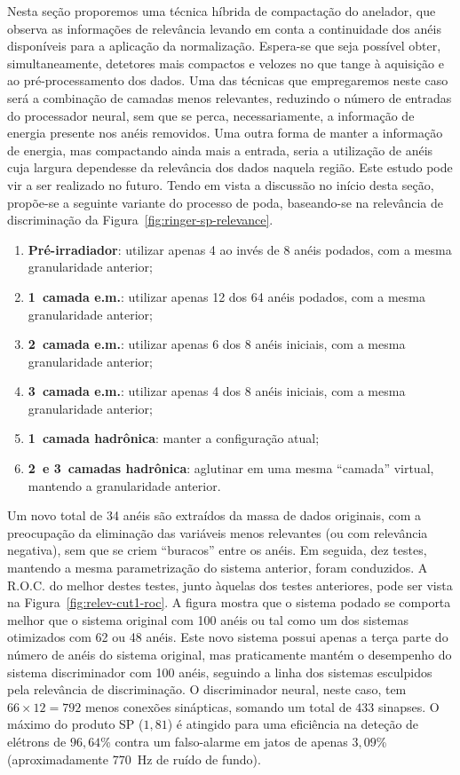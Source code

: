 Nesta seção proporemos uma técnica híbrida de compactação do anelador, que
observa as informações de relevância levando em conta a continuidade dos anéis
disponíveis para a aplicação da normalização. Espera-se que seja possível
obter, simultaneamente, detetores mais compactos e velozes no que tange à
aquisição e ao pré-processamento dos dados. Uma das técnicas que empregaremos
neste caso será a combinação de camadas menos relevantes, reduzindo o número
de entradas do processador neural, sem que se perca, necessariamente, a
informação de energia presente nos anéis removidos. Uma outra forma de manter
a informação de energia, mas compactando ainda mais a entrada, seria a
utilização de anéis cuja largura dependesse da relevância dos dados naquela
região. Este estudo pode vir a ser realizado no futuro. Tendo em vista a
discussão no início desta seção, propõe-se a seguinte variante do processo de
poda, baseando-se na relevância de discriminação da
Figura~\ref{fig:ringer-sp-relevance}.

\begin{enumerate}
\item \textbf{Pré-irradiador}: utilizar apenas 4 ao invés de 8 anéis podados,
com a mesma granularidade anterior;
\item \textbf{1\eira\ camada e.m.}: utilizar apenas 12 dos 64 anéis podados,
com a mesma granularidade anterior;
\item \textbf{2\eira\ camada e.m.}: utilizar apenas 6 dos 8 anéis iniciais,
com a mesma granularidade anterior;
\item \textbf{3\eira\ camada e.m.}: utilizar apenas 4 dos 8 anéis iniciais,
com a mesma granularidade anterior;
\item \textbf{1\eira\ camada hadrônica}: manter a configuração atual;
\item \textbf{2\eira\ e 3\eira\ camadas hadrônica}: aglutinar em uma mesma
``camada'' virtual, mantendo a granularidade anterior.
\end{enumerate} 

Um novo total de 34 anéis são extraídos da massa de dados originais, com a
preocupação da eliminação das variáveis menos relevantes (ou com relevância
negativa), sem que se criem ``buracos'' entre os anéis. Em seguida, dez testes,
mantendo a mesma parametrização do sistema anterior, foram conduzidos. A
R.O.C. do melhor destes testes, junto àquelas dos testes anteriores, pode ser
vista na Figura~\ref{fig:relev-cut1-roc}. A figura mostra que o sistema podado
se comporta melhor que o sistema original com 100 anéis ou tal como um dos
sistemas otimizados com 62 ou 48 anéis. Este novo sistema possui apenas a
terça parte do número de anéis do sistema original, mas praticamente mantém o
desempenho do sistema discriminador com 100 anéis, seguindo a linha dos
sistemas esculpidos pela relevância de discriminação. O discriminador neural,
neste caso, tem $66 \times 12 = 792$ menos conexões sinápticas, somando um
total de $433$ sinapses. O máximo do produto SP ($1,81$) é atingido para uma
eficiência na deteção de elétrons de $96,64$\% contra um falso-alarme em jatos
de apenas $3,09$\% (aproximadamente 770~Hz de ruído de fundo).

